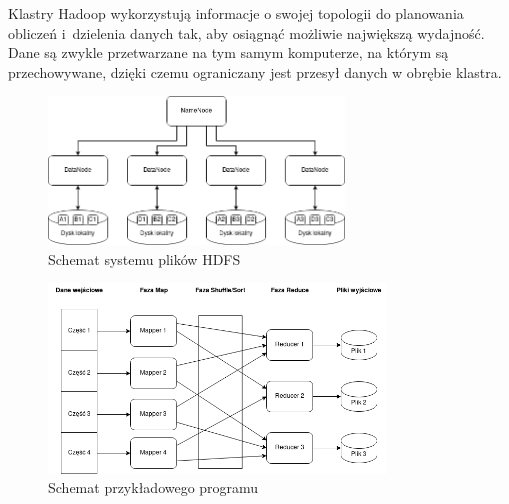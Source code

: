 Klastry Hadoop wykorzystują informacje o swojej topologii do planowania obliczeń
i~dzielenia danych tak, aby osiągnąć możliwie największą wydajność. Dane są zwykle
przetwarzane na tym samym komputerze, na którym są przechowywane, dzięki czemu
ograniczany jest przesył danych w obrębie klastra. \newpage

\begin{figure}
      \centering
      \includegraphics[width=0.7\textwidth]{./graf/HDFS.png}
      \caption{Schemat systemu plików HDFS}
      \label{fig:hdfs}
\end{figure}

\begin{figure}
      \centering
      \includegraphics[width=0.8\textwidth]{./graf/MapReduce.png}
      \caption{Schemat przykładowego programu }
      \label{fig:mapreduce}
\end{figure}

